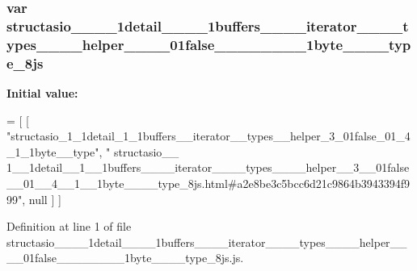 \subsubsection[{structasio\+\_\+\+\_\+1\+\_\+\+\_\+1detail\+\_\+\+\_\+1\+\_\+\+\_\+1buffers\+\_\+\+\_\+\+\_\+\+\_\+iterator\+\_\+\+\_\+\+\_\+\+\_\+types\+\_\+\+\_\+\+\_\+\+\_\+helper\+\_\+\+\_\+3\+\_\+\+\_\+01false\+\_\+\+\_\+01\+\_\+\+\_\+4\+\_\+\+\_\+1\+\_\+\+\_\+1byte\+\_\+\+\_\+\+\_\+\+\_\+type\+\_\+8js}]{\setlength{\rightskip}{0pt plus 5cm}var structasio\+\_\+\+\_\+\_\+\+\_\+1detail\+\_\+\+\_\+\_\+\+\_\+1buffers\+\_\+\+\_\+\+\_\+\+\_\+iterator\+\_\+\+\_\+\+\_\+\+\_\+types\+\_\+\+\_\+\+\_\+\+\_\+helper\+\_\+\+\_\+\_\+\+\_\+01false\+\_\+\+\_\+\_\+\+\_\+\_\+\+\_\+\_\+\+\_\+1byte\+\_\+\+\_\+\+\_\+\+\_\+type\+\_\+8js}\label{structasio____1____1detail____1____1buffers________iterator________types________helper____3____0b6bb121a61d701ea1975694184acbe2f_a21129bac6bf427271e57b3ed111734b4}
{\bfseries Initial value\+:}
\begin{DoxyCode}
=
[
    [ \textcolor{stringliteral}{"structasio\_1\_1detail\_1\_1buffers\_\_iterator\_\_types\_\_helper\_3\_01false\_01\_4\_1\_1byte\_\_type"}, \textcolor{stringliteral}{"
      structasio\_\_
      1\_\_1detail\_\_1\_\_1buffers\_\_\_\_iterator\_\_\_\_types\_\_\_\_helper\_\_3\_\_01false\_\_01\_\_4\_\_1\_\_1byte\_\_\_\_type\_8js.html#a2e8be3c5bcc6d21c9864b3943394f999"}, null ]
]
\end{DoxyCode}


Definition at line 1 of file structasio\+\_\+\+\_\+\_\+\+\_\+1detail\+\_\+\+\_\+\_\+\+\_\+1buffers\+\_\+\+\_\+\+\_\+\+\_\+iterator\+\_\+\+\_\+\+\_\+\+\_\+types\+\_\+\+\_\+\+\_\+\+\_\+helper\+\_\+\+\_\+\_\+\+\_\+01false\+\_\+\+\_\+\_\+\+\_\+\_\+\+\_\+\_\+\+\_\+1byte\+\_\+\+\_\+\+\_\+\+\_\+type\+\_\+8js.\+js.

